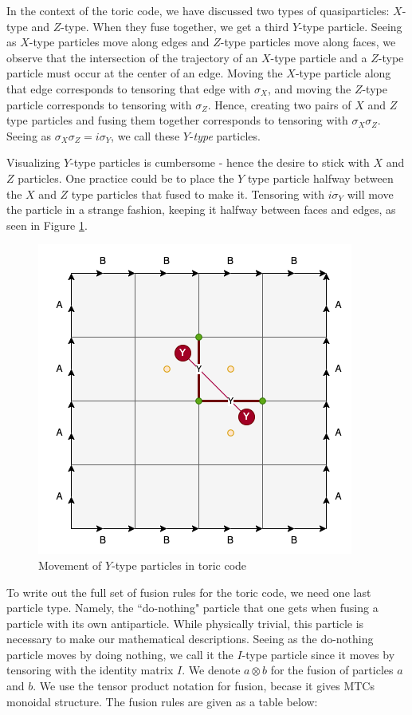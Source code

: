 \documentclass{article}
\theoremstyle{definition}
\numberwithin{figure}{section}
\begin{document}
In the context of the toric code, we have discussed two types of quasiparticles: $X$-type and $Z$-type. When they fuse together, we get a third $Y$-type particle. Seeing as $X$-type particles move along edges and $Z$-type particles move along faces, we observe that the intersection of the trajectory of an $X$-type particle and a $Z$-type particle must occur at the center of an edge. Moving the $X$-type particle along that edge corresponds to tensoring that edge with $\sigma_{X}$, and moving the $Z$-type particle corresponds to tensoring with $\sigma_{Z}$. Hence, creating two pairs of $X$ and $Z$ type particles and fusing them together corresponds to tensoring with $\sigma_X\sigma_Z$. Seeing as $\sigma_X\sigma_Z=i\sigma_Y$, we call these $Y$-\textit{type} particles.

Visualizing $Y$-type particles is cumbersome - hence the desire to stick with $X$ and $Z$ particles. One practice could be to place the $Y$ type particle halfway between the $X$ and $Z$ type particles that fused to make it. Tensoring with $i\sigma_Y$ will move the particle in a strange fashion, keeping it halfway between faces and edges, as seen in Figure \ref{fig:Y-type}.

\begin{figure}
\begin{center}
\includegraphics[scale=0.30]{Y-type}
\caption{Movement of $Y$-type particles in toric code}
\label{fig:Y-type}
\end{center}
\end{figure}

To write out the full set of fusion rules for the toric code, we need one last particle type. Namely, the ``do-nothing" particle that one gets when fusing a particle with its own antiparticle. While physically trivial, this particle is necessary to make our mathematical descriptions. Seeing as the do-nothing particle moves by doing nothing, we call it the $I$-type particle since it moves by tensoring with the identity matrix $I$. We denote $a\otimes b$ for the fusion of particles $a$ and $b$. We use the tensor product notation for fusion, becase it gives MTCs monoidal structure. The fusion rules are given as a table below:
\end{document}
